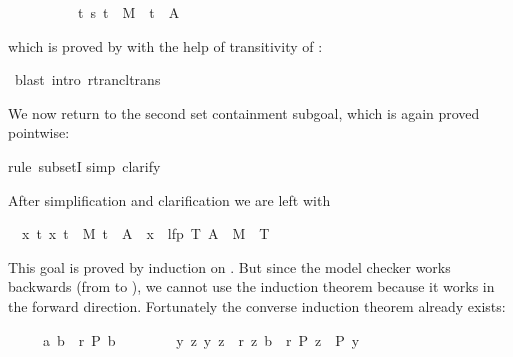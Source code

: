 \begin{isabellebody}
\begin{isamarkuptxt}
\begin{isabelle}
\ \ \ \ \ \ \ \ \ {\isasymLongrightarrow}\ {\isasymexists}t{\isachardot}\ {\isacharparenleft}s{\isacharcomma}\ t{\isacharparenright}\ {\isasymin}\ M{\isacharcircum}{\isacharasterisk}\ {\isasymand}\ t\ {\isasymin}\ A
\end{isabelle}
which is proved by  with the help of transitivity of \isa{{\isacharcircum}{\isacharasterisk}}:%
\end{isamarkuptxt}%
\ blast\ intro{\isacharcolon}\ rtrancl{\isacharunderscore}trans{\isacharparenright}%
\begin{isamarkuptxt}%
We now return to the second set containment subgoal, which is again proved
pointwise:%
\end{isamarkuptxt}%
rule\ subsetI{\isacharparenright}\isanewline
{}simp{\isacharcomma}\ clarify{\isacharparenright}%
\begin{isamarkuptxt}%
\noindent
After simplification and clarification we are left with
\begin{isabelle}%
\ {}{\isachardot}\ {\isasymAnd}x\ t{\isachardot}\ {\isasymlbrakk}{\isacharparenleft}x{\isacharcomma}\ t{\isacharparenright}\ {\isasymin}\ M\isactrlsup {\isacharasterisk}{\isacharsemicolon}\ t\ {\isasymin}\ A{\isasymrbrakk}\ {\isasymLongrightarrow}\ x\ {\isasymin}\ lfp\ {\isacharparenleft}{\isasymlambda}T{\isachardot}\ A\ {\isasymunion}\ M{\isacharcircum}{\isacharminus}{}\ {\isacharcircum}{\isacharcircum}\ T{\isacharparenright}%
\end{isabelle}
This goal is proved by induction on . But since the model
checker works backwards (from  to ), we cannot use the
induction theorem  because it works in the
forward direction. Fortunately the converse induction theorem
 already exists:
\begin{isabelle}%
\ \ \ \ \ {\isasymlbrakk}{\isacharparenleft}a{\isacharcomma}\ b{\isacharparenright}\ {\isasymin}\ r\isactrlsup {\isacharasterisk}{\isacharsemicolon}\ P\ b{\isacharsemicolon}\isanewline
\ \ \ \ \ \ \ \ {\isasymAnd}y\ z{\isachardot}\ {\isasymlbrakk}{\isacharparenleft}y{\isacharcomma}\ z{\isacharparenright}\ {\isasymin}\ r{\isacharsemicolon}\ {\isacharparenleft}z{\isacharcomma}\ b{\isacharparenright}\ {\isasymin}\ r\isactrlsup {\isacharasterisk}{\isacharsemicolon}\ P\ z{\isasymrbrakk}\ {\isasymLongrightarrow}\ P\ y{\isasymrbrakk}\isanewline

\end{isabelle}
\end{isamarkuptxt}
\end{isabellebody}
